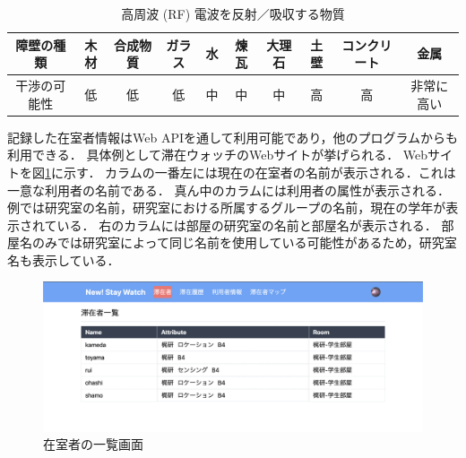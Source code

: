 


\begin{table}[H]
  \begin{center}
    \caption{高周波 (RF) 電波を反射／吸収する物質}
    \label{tb:rf}
    \begin{tabular}{|c||c|c|c|c|c|c|c|c|c|} \hline
      障壁の種類  & 木材 & 合成物質 & ガラス & 水 & 煉瓦 & 大理石 & 土壁 & コンクリート & 金属    \\ \hline
      干渉の可能性 & 低  & 低    & 低   & 中 & 中  & 中   & 高  & 高      & 非常に高い \\ \hline
    \end{tabular}
  \end{center}
\end{table}

記録した在室者情報はWeb APIを通して利用可能であり，他のプログラムからも利用できる．
具体例として滞在ウォッチのWebサイトが挙げられる．
Webサイトを図\ref{fig:stayer}に示す．
カラムの一番左には現在の在室者の名前が表示される．これは一意な利用者の名前である．
真ん中のカラムには利用者の属性が表示される．例では研究室の名前，研究室における所属するグループの名前，現在の学年が表示されている．
右のカラムには部屋の研究室の名前と部屋名が表示される．
部屋名のみでは研究室によって同じ名前を使用している可能性があるため，研究室名も表示している．





\begin{figure}[H]
  \begin{center}
    \includegraphics[width=160mm]{image/stayer.png}
    \caption{在室者の一覧画面}
    \label{fig:stayer}
  \end{center}
\end{figure}


